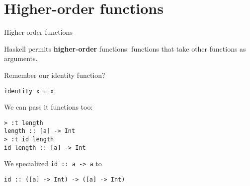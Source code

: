 
\section{Higher-order functions}

%
\begin{frame}[fragile]{Higher-order functions}

Haskell permits \textbf{higher-order} functions: functions that take other
functions as arguments.

Remember our identity function?

\begin{verbatim}
identity x = x
\end{verbatim}

We can pass it functions too:

\begin{verbatim}
> :t length
length :: [a] -> Int
> :t id length
id length :: [a] -> Int
\end{verbatim}

We specialized \texttt{id :: a -> a} to

\texttt{id :: ([a] -> Int) -> ([a] -> Int)}

\end{frame}
